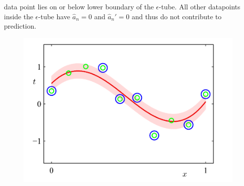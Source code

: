 data point lies on or below lower boundary of the $\epsilon$-tube. All other datapoints inside the $\epsilon$-tube have $\hat{a}_{n} = 0$ and  $\hat{a}_{n}' = 0$ and thus do not contribute to prediction.
\begin{figure}[H]
    \centering
    \includegraphics[width=15cm]{images/Kernel Methods/epsilon_tube.png}
    \label{fig:epsilon_tube}
\end{figure}
